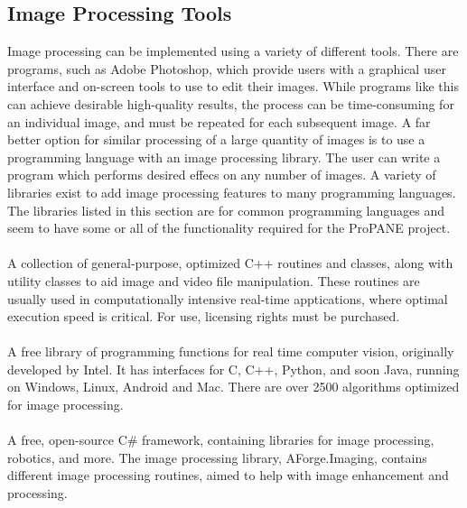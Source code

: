 \documentclass{article}
\begin{document}
\subsection*{Image Processing Tools}

Image processing can be implemented using a variety of different tools.  There are programs, such as Adobe Photoshop, which provide users with a graphical user interface and on-screen tools to use to edit their images.  While programs like this can achieve desirable high-quality results, the process can be time-consuming for an individual image, and must be repeated for each subsequent image.  A far better option for similar processing of a large quantity of images is to use a programming language with an image processing library.  The user can write a program which performs desired effecs on any number of images.  A variety of libraries exist to add image processing features to many programming languages.  The libraries listed in this section are for common programming languages and seem to have some or all of the functionality required for the ProPANE project.  \\ 

 \cite{eutecus} \\

\noindent A collection of general-purpose, optimized C++ routines and classes, along with utility classes to aid image and video file manipulation.  These routines are usually used in computationally intensive real-time apptications, where optimal execution speed is critical.  For use, licensing rights must be purchased. \\

 \cite{opencv} \\

\noindent A free library of programming functions for real time computer vision, originally developed by Intel.  It has interfaces for C, C++, Python, and soon Java, running on Windows, Linux, Android and Mac.  There are over 2500 algorithms optimized for image processing.  \\

 \cite{aforge1} \\

\noindent A free, open-source C\# framework, containing libraries for image processing, robotics, and more.  The image processing library, AForge.Imaging, contains different image processing routines, aimed to help with image enhancement and processing.  \\
\end{document}
